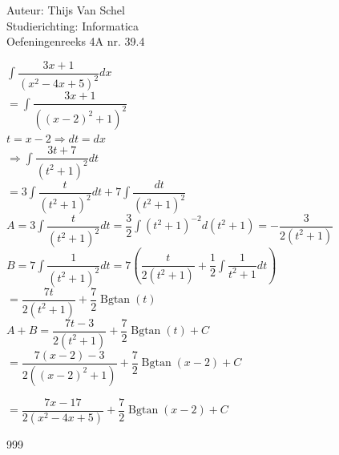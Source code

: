 \documentclass[a4paper]{article}
\newcommand{\dint}{\displaystyle\int}
\newcommand{\Bgtan}{\operatorname{Bgtan}}
\begin{document}
  
\noindent \large Auteur: Thijs Van Schel \\
\noindent \large Studierichting: Informatica\\
\noindent \large Oefeningenreeks 4A nr. 39.4\\

\medskip

\normalsize

$\dint \dfrac{3x+1}{(x^2-4x+5)^2}dx$\\

$= \dint \dfrac{3x+1}{((x-2)^2+1)^2}$\\

$t = x-2 \Rightarrow dt = dx$\\

$\Rightarrow \dint \dfrac{3t+7}{(t^2+1)^2}dt$\\

$= 3\dint\dfrac{t}{(t^2+1)^2}dt+7\dint\dfrac{dt}{(t^2+1)^2}$\\

$A = 3 \dint \dfrac{t}{(t^2+1)^2} dt = \dfrac{3}{2} \dint (t^2+1)^{-2} d(t^2+1) = -\dfrac{3}{2(t^2+1)}$\\

$B = 7 \dint \dfrac{1}{(t^2+1)^2} dt = 7 \left( \dfrac{t}{2(t^2+1)} + \dfrac{1}{2} \dint \dfrac{1}{t^2+1} dt \right)$\\

$=\dfrac{7t}{2(t^2+1)} + \dfrac{7}{2} \Bgtan (t)$\\

$A + B = \dfrac{7t-3}{2(t^2+1)} + \dfrac{7}{2} \Bgtan(t) + C$\\

$= \dfrac{7(x-2)-3}{2((x-2)^2+1)} + \dfrac{7}{2} \Bgtan(x-2) + C $

$= \dfrac{7x-17}{2(x^2-4x+5)} + \dfrac{7}{2} \Bgtan(x-2) + C $

\begin{thebibliography}{999}
\end{thebibliography}
\end{document}
